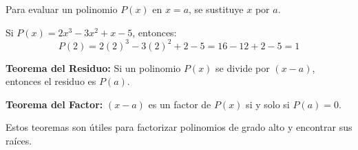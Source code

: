 
\begin{definition}
Para evaluar un polinomio $P(x)$ en $x = a$, se sustituye $x$ por $a$.
\end{definition}

\begin{example}
Si $P(x) = 2x^3 - 3x^2 + x - 5$, entonces:
$$P(2) = 2(2)^3 - 3(2)^2 + 2 - 5 = 16 - 12 + 2 - 5 = 1$$
\end{example}

\begin{theorem}
\textbf{Teorema del Residuo:} Si un polinomio $P(x)$ se divide por $(x - a)$, entonces el residuo es $P(a)$.

\noindent \textbf{Teorema del Factor:} $(x - a)$ es un factor de $P(x)$ si y solo si $P(a) = 0$.
\end{theorem}

Estos teoremas son útiles para factorizar polinomios de grado alto y encontrar sus raíces.

